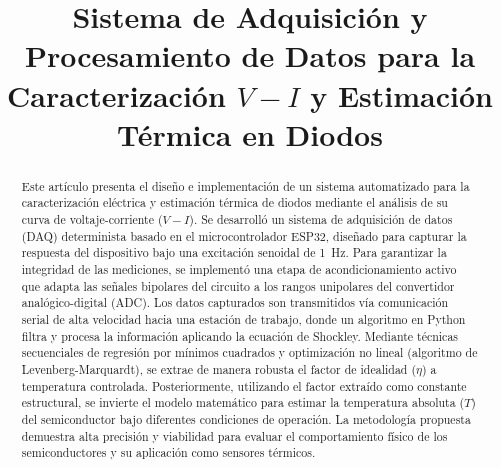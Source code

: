 \documentclass[conference]{IEEEtran}
\begin{document}
\title{Sistema de Adquisición y Procesamiento de Datos para la Caracterización $V-I$ y Estimación Térmica en Diodos}

\author{
}
\IEEEaftertitletext{\vspace{-1\baselineskip}}
\maketitle

\renewcommand\abstractname{Resumen}\begin{abstract}
Este artículo presenta el diseño e implementación de un sistema automatizado para la caracterización eléctrica y estimación térmica de diodos mediante el análisis de su curva de voltaje-corriente ($V-I$). Se desarrolló un sistema de adquisición de datos (DAQ) determinista basado en el microcontrolador ESP32, diseñado para capturar la respuesta del dispositivo bajo una excitación senoidal de \SI{1}{\hertz}. Para garantizar la integridad de las mediciones, se implementó una etapa de acondicionamiento activo que adapta las señales bipolares del circuito a los rangos unipolares del convertidor analógico-digital (ADC). Los datos capturados son transmitidos vía comunicación serial de alta velocidad hacia una estación de trabajo, donde un algoritmo en Python filtra y procesa la información aplicando la ecuación de Shockley. Mediante técnicas secuenciales de regresión por mínimos cuadrados y optimización no lineal (algoritmo de Levenberg-Marquardt), se extrae de manera robusta el factor de idealidad ($\eta$) a temperatura controlada. Posteriormente, utilizando el factor extraído como constante estructural, se invierte el modelo matemático para estimar la temperatura absoluta ($T$) del semiconductor bajo diferentes condiciones de operación. La metodología propuesta demuestra alta precisión y viabilidad para evaluar el comportamiento físico de los semiconductores y su aplicación como sensores térmicos.
\end{abstract}
\end{document}
